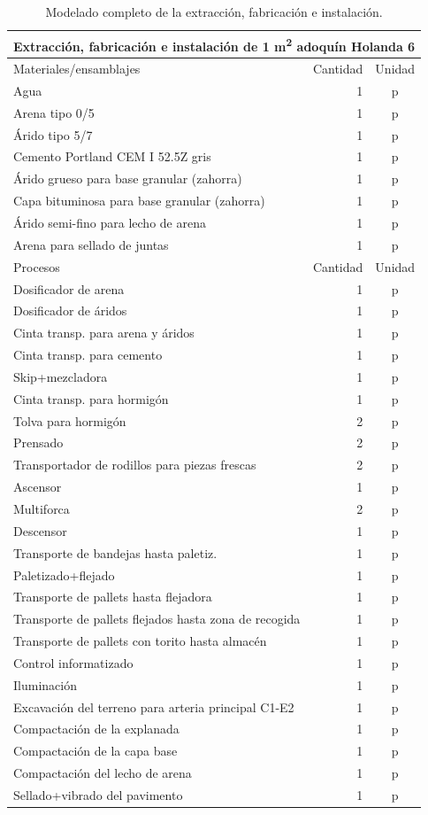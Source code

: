 \begin{table}[!htp]
\centering
\begin{tabular}{p{8cm}rc}
\toprule
\multicolumn{3}{c}{Extracción, fabricación e instalación de 1 \si{m^2} adoquín Holanda 6}\\
\midrule
Materiales/ensamblajes & Cantidad & Unidad\\
\midrule
Agua & 1 & p\\
Arena tipo 0/5 & 1 & p\\
Árido tipo 5/7 & 1 & p\\
Cemento Portland CEM I 52.5Z gris & 1 & p\\
Árido grueso para base granular (zahorra) & 1 & p\\
Capa bituminosa para base granular (zahorra) & 1 & p\\
Árido semi-fino para lecho de arena & 1 & p\\
Arena para sellado de juntas & 1 & p\\
\midrule
Procesos & Cantidad & Unidad\\
\midrule
Dosificador de arena & 1 & p\\
Dosificador de áridos & 1 & p\\
Cinta transp. para arena y áridos & 1 & p\\
Cinta transp. para cemento & 1 & p\\
Skip+mezcladora & 1 & p\\
Cinta transp. para hormigón & 1 & p\\
Tolva para hormigón & 2 & p\\
Prensado & 2 & p\\
Transportador de rodillos para piezas frescas & 2 & p\\
Ascensor & 1 & p\\
Multiforca & 2 & p\\
Descensor & 1 & p\\
Transporte de bandejas hasta paletiz. & 1 & p\\
Paletizado+flejado & 1 & p\\
Transporte de pallets hasta flejadora & 1 & p\\
Transporte de pallets flejados hasta zona de recogida & 1 & p\\
Transporte de pallets con torito hasta almacén & 1 & p\\
Control informatizado & 1 & p\\
Iluminación & 1 & p\\
Excavación del terreno para arteria principal C1-E2 & 1 & p\\
Compactación de la explanada & 1 & p\\
Compactación de la capa base & 1 & p\\
Compactación del lecho de arena & 1 & p\\
Sellado+vibrado del pavimento & 1 & p\\
\bottomrule
\end{tabular}
\caption{Modelado completo de la extracción, fabricación e instalación.}
\label{modeladocompletofabricacion}
\end{table}

